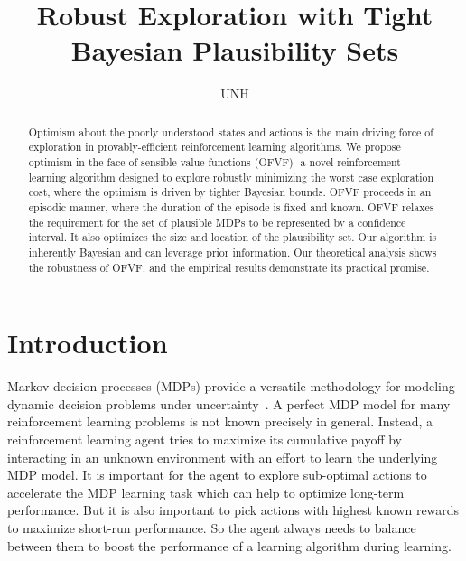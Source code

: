 \documentclass{article}
\title{Robust Exploration with Tight Bayesian Plausibility Sets}
\author{
UNH
}
\date{}
\theoremstyle{plain}
\theoremstyle{definition}
\begin{document}
\maketitle


\begin{abstract}
Optimism about the poorly understood states and actions is the main driving force of exploration in provably-efficient reinforcement learning algorithms. We propose optimism in the face of sensible value functions (OFVF)- a novel reinforcement learning algorithm designed to explore robustly minimizing the worst case exploration cost, where the optimism is driven by tighter Bayesian bounds. OFVF proceeds in an episodic manner, where the duration of the episode is fixed and known. OFVF relaxes the requirement for the set of plausible MDPs to be represented by a confidence interval. It also optimizes the size and location of the plausibility set. Our algorithm is inherently Bayesian and can leverage prior information. Our theoretical analysis shows the robustness of OFVF, and the empirical results demonstrate its practical promise.
\end{abstract}

\section{Introduction}

Markov decision processes (MDPs) provide a versatile methodology for modeling dynamic decision problems under uncertainty~\citep{Bertsekas1996,Sutton1998,Puterman2005}. A perfect MDP model for many reinforcement learning problems is not known precisely in general. Instead, a reinforcement learning agent tries to maximize its cumulative payoff by interacting in an unknown environment with an effort to learn the underlying MDP model. It is important for the agent to explore
sub-optimal actions to accelerate the MDP learning task which can help to optimize long-term performance. But it is also important to pick actions with highest known rewards to maximize short-run performance. So the agent always needs to balance between them to boost the performance of a learning algorithm during learning. 
\end{document}
